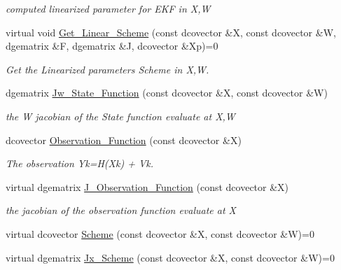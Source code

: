 \begin{CompactItemize}
\begin{CompactList}\small\item\em computed linearized parameter for EKF in X,W \item\end{CompactList}\item 
virtual void \hyperlink{class_discrete___approximation___c_d___model_0a486fada10e6f5569d186edc7b32110}{Get\_\-Linear\_\-Scheme} (const dcovector \&X, const dcovector \&W, dgematrix \&F, dgematrix \&J, dcovector \&Xp)=0
\begin{CompactList}\small\item\em Get the Linearized parameters Scheme in X,W. \item\end{CompactList}\item 
dgematrix \hyperlink{class_discrete___approximation___c_d___model_a5021c3ba6bd2cce5558a783843461ab}{Jw\_\-State\_\-Function} (const dcovector \&X, const dcovector \&W)
\begin{CompactList}\small\item\em the W jacobian of the State function evaluate at X,W \item\end{CompactList}\item 
dcovector \hyperlink{class_discrete___approximation___c_d___model_fe110c215bf843377888ad5ba823088e}{Observation\_\-Function} (const dcovector \&X)
\begin{CompactList}\small\item\em The observation Yk=H(Xk) + Vk. \item\end{CompactList}\item 
virtual dgematrix \hyperlink{class_discrete___approximation___c_d___model_be25ebdd3667dff8f8f43b72dc4e59ef}{J\_\-Observation\_\-Function} (const dcovector \&X)
\begin{CompactList}\small\item\em the jacobian of the observation function evaluate at X \item\end{CompactList}\item 
virtual dcovector \hyperlink{class_discrete___approximation___c_d___model_1ea9a1d618890fc51db6fa98eeb7af7f}{Scheme} (const dcovector \&X, const dcovector \&W)=0
\item 
virtual dgematrix \hyperlink{class_discrete___approximation___c_d___model_7a3dcae055d90be0b8a231eff961e2a2}{Jx\_\-Scheme} (const dcovector \&X, const dcovector \&W)=0

\end{CompactItemize}
